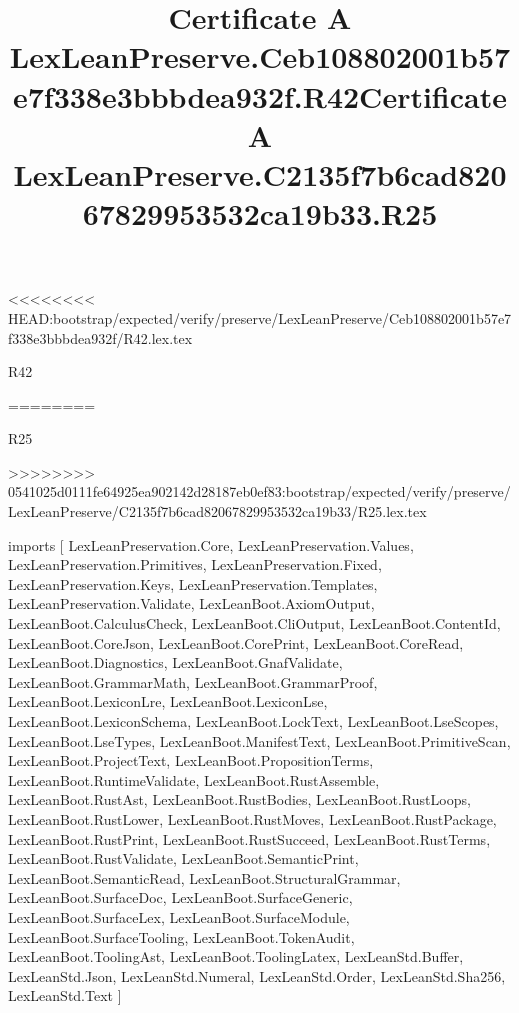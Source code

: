 <<<<<<<< HEAD:bootstrap/expected/verify/preserve/LexLeanPreserve/Ceb108802001b57e7f338e3bbbdea932f/R42.lex.tex
\begin{lexlean}{R42}
\title{Certificate A LexLeanPreserve.Ceb108802001b57e7f338e3bbbdea932f.R42}
========
\begin{lexlean}{R25}
\title{Certificate A LexLeanPreserve.C2135f7b6cad82067829953532ca19b33.R25}
>>>>>>>> 0541025d0111fe64925ea902142d28187eb0ef83:bootstrap/expected/verify/preserve/LexLeanPreserve/C2135f7b6cad82067829953532ca19b33/R25.lex.tex
\begin{coremodule}
imports [
  LexLeanPreservation.Core,
  LexLeanPreservation.Values,
  LexLeanPreservation.Primitives,
  LexLeanPreservation.Fixed,
  LexLeanPreservation.Keys,
  LexLeanPreservation.Templates,
  LexLeanPreservation.Validate,
  LexLeanBoot.AxiomOutput,
  LexLeanBoot.CalculusCheck,
  LexLeanBoot.CliOutput,
  LexLeanBoot.ContentId,
  LexLeanBoot.CoreJson,
  LexLeanBoot.CorePrint,
  LexLeanBoot.CoreRead,
  LexLeanBoot.Diagnostics,
  LexLeanBoot.GnafValidate,
  LexLeanBoot.GrammarMath,
  LexLeanBoot.GrammarProof,
  LexLeanBoot.LexiconLre,
  LexLeanBoot.LexiconLse,
  LexLeanBoot.LexiconSchema,
  LexLeanBoot.LockText,
  LexLeanBoot.LseScopes,
  LexLeanBoot.LseTypes,
  LexLeanBoot.ManifestText,
  LexLeanBoot.PrimitiveScan,
  LexLeanBoot.ProjectText,
  LexLeanBoot.PropositionTerms,
  LexLeanBoot.RuntimeValidate,
  LexLeanBoot.RustAssemble,
  LexLeanBoot.RustAst,
  LexLeanBoot.RustBodies,
  LexLeanBoot.RustLoops,
  LexLeanBoot.RustLower,
  LexLeanBoot.RustMoves,
  LexLeanBoot.RustPackage,
  LexLeanBoot.RustPrint,
  LexLeanBoot.RustSucceed,
  LexLeanBoot.RustTerms,
  LexLeanBoot.RustValidate,
  LexLeanBoot.SemanticPrint,
  LexLeanBoot.SemanticRead,
  LexLeanBoot.StructuralGrammar,
  LexLeanBoot.SurfaceDoc,
  LexLeanBoot.SurfaceGeneric,
  LexLeanBoot.SurfaceLex,
  LexLeanBoot.SurfaceModule,
  LexLeanBoot.SurfaceTooling,
  LexLeanBoot.TokenAudit,
  LexLeanBoot.ToolingAst,
  LexLeanBoot.ToolingLatex,
  LexLeanStd.Buffer,
  LexLeanStd.Json,
  LexLeanStd.Numeral,
  LexLeanStd.Order,
  LexLeanStd.Sha256,
  LexLeanStd.Text
]


\end{coremodule}
\end{lexlean}
\end{lexlean}
